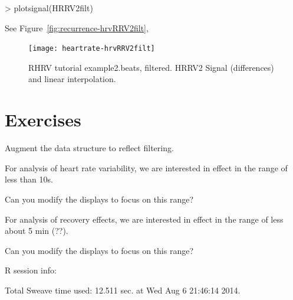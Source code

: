 \documentclass[a4paper, english, utf8]{amsart}
\newcommand{\figref}[1]{Figure\ \vref{#1}}
\newcommand{\R}{{\normalfont\textsf{R}}{}}
\begin{document}
\begin{Schunk}
\begin{Sinput}
> plotsignal(HRRV2filt)
\end{Sinput}
\end{Schunk}
See \figref{fig:recurrence-hrvRRV2filt},

\begin{figure}[htbp]
\begin{center}
\texttt{[image: heartrate-hrvRRV2filt]}
\caption{RHRV tutorial example2.beats, filtered. HRRV2 Signal (differences) and linear interpolation.}
\label{fig:recurrence-hrvRRV2filt}
\end{center}
\end{figure}

\section{Exercises}
\begin{exca}
Augment the data structure to reflect filtering.
\end{exca}

\begin{exca}
For analysis of heart rate variability, we are interested in effect in the range of less than 10s.

Can you modify the displays to focus on this range?
\end{exca}

\begin{exca}
For analysis of recovery effects, we are interested in effect in the range of less about 5 min (??).

Can you modify the displays to focus on this range?
\end{exca}

\clearpage
\nocite{*}
%

%
\clearpage

\printindex

%

\clearpage
\R{} session info:

Total Sweave time used: 12.511 sec. at Wed Aug  6 21:46:14 2014.
\end{document}
